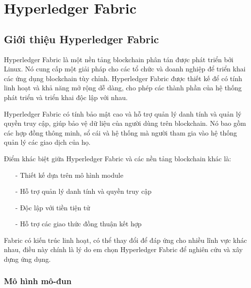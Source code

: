 \chapter{ Hyperledger Fabric}
\section{Giới thiệu Hyperledger Fabric }
Hyperledger Fabric là một nền tảng blockchain phân tán được phát triển bởi Linux. Nó 
cung cấp một giải pháp cho các tổ chức và doanh nghiệp để triển khai các ứng dụng blockchain 
tùy chỉnh. Hyperledger Fabric được thiết kế để có tính linh hoạt và khả năng mở rộng dễ dàng, 
cho phép các thành phần của hệ thống phát triển và triển khai độc lập với nhau.

Hyperledger Fabric có tính bảo mật cao và hỗ trợ quản lý danh tính và quản lý quyền truy cập, 
giúp bảo vệ dữ liệu của người dùng trên blockchain. Nó bao gồm các hợp đồng thông minh, sổ cái và
hệ thống mà người tham gia vào hệ thống quản lý các giao dịch của họ.


Điểm khác biệt giữa Hyperledger Fabric và các nền tảng blockchain khác là:
\begin{itemize}
    \item[-] Thiết kế dựa trên mô hình module 
    \item[-] Hỗ trợ quản lý danh tính và quyền truy cập
    \item[-] Độc lập với tiền tiện tử
    \item[-] Hỗ trợ các giao thức đồng thuận kết hợp
\end{itemize}

Fabric có kiến trúc linh hoạt, có thể thay đổi để đáp ứng cho nhiều lĩnh vực khác nhau, 
điều này chính là lý do em chọn Hyperledger Fabric để nghiên cứu và xây dựng ứng dụng.
\subsection{Mô hình mô-đun}

